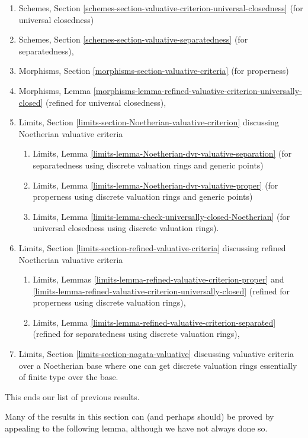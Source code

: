 \documentclass{stacks-project}
\theoremstyle{plain}
\theoremstyle{definition}
\theoremstyle{remark}
\numberwithin{equation}{subsection}
\begin{document}
\begin{enumerate}
\item Schemes, Section
\ref{schemes-section-valuative-criterion-universal-closedness}
(for universal closedness)
\item Schemes, Section \ref{schemes-section-valuative-separatedness}
(for separatedness),
\item Morphisms, Section \ref{morphisms-section-valuative-criteria}
(for properness)
\item Morphisms, Lemma
\ref{morphisms-lemma-refined-valuative-criterion-universally-closed}
(refined for universal closedness),
\item Limits, Section \ref{limits-section-Noetherian-valuative-criterion}
discussing Noetherian valuative criteria
\begin{enumerate}
\item Limits, Lemma \ref{limits-lemma-Noetherian-dvr-valuative-separation}
(for separatedness using discrete valuation rings and generic points)
\item Limits, Lemma \ref{limits-lemma-Noetherian-dvr-valuative-proper}
(for properness using discrete valuation rings and generic points)
\item Limits, Lemma \ref{limits-lemma-check-universally-closed-Noetherian}
(for universal closedness using discrete valuation rings).
\end{enumerate}
\item Limits, Section \ref{limits-section-refined-valuative-criteria}
discussing refined Noetherian valuative criteria
\begin{enumerate}
\item Limits, Lemmas
\ref{limits-lemma-refined-valuative-criterion-proper} and
\ref{limits-lemma-refined-valuative-criterion-universally-closed}
(refined for properness using discrete valuation rings),
\item Limits, Lemma \ref{limits-lemma-refined-valuative-criterion-separated}
(refined for separatedness using discrete valuation rings),
\end{enumerate}
\item Limits, Section \ref{limits-section-nagata-valuative}
discussing valuative criteria over a Noetherian base where
one can get discrete valuation rings essentially of finite type
over the base.
\end{enumerate}
This ends our list of previous results.

\medskip\noindent
Many of the results in this section can (and perhaps should)
be proved by appealing to the following lemma, although we have not
always done so.
\end{document}
